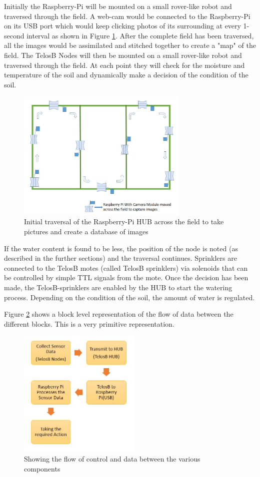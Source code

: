 \documentclass{sig-alternate-05-2015}
\begin{document}
Initially the Raspberry-Pi will be mounted on a small rover-like robot and traversed through the field. A web-cam would be connected to the Raspberry-Pi on its USB port which would keep clicking photos of its surrounding at every 1-second interval as shown in Figure \ref{rpi2}. After the complete field has been traversed, all the images would be assimilated and stitched together to create a "map" of the field. The TelosB Nodes will then be mounted on a small rover-like robot and traversed through the field. At each point they will check for the moisture and temperature of the soil and dynamically make a decision of the condition of the soil. 
\begin{figure}[h]
\centering
\includegraphics[width=3.2in]{RPi_imgs.jpg}
\caption{Initial traversal of the Raspberry-Pi HUB across the field to take pictures and create a database of images}
\label{rpi2}
\end{figure}
If the water content is found to be less, the position of the node is noted (as described in the further sections) and the traversal continues. Sprinklers are connected to the TelosB motes (called TelosB sprinklers) via solenoids that can be controlled by simple TTL signals from the mote. Once the decision has been made, the TelosB-sprinklers are enabled by the HUB to start the watering process. Depending on the condition of the soil, the amount of water is regulated.

Figure \ref{flow} shows a block level representation of the flow of data between the different blocks. This is a very primitive representation.

\begin{figure}[h]
\centering
\includegraphics[width=2.3in]{flow.jpg}
\caption{Showing the flow of control and data between the various components}
\label{flow}
\end{figure}
\end{document}
